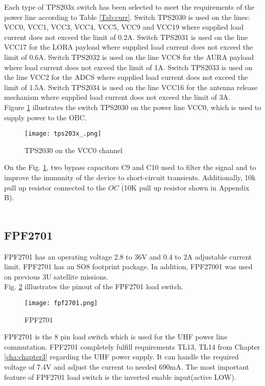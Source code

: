 Each type of TPS203x switch has been selected to meet the requirements of the power line according to Table \ref{Tab:curr}. Switch TPS2030 is used on the lines: VCC0, VCC1, VCC3, VCC4, VCC5, VCC9 and VCC19  where supplied  load current does not exceed the limit of 0.2A. Switch TPS2031 is used on the line VCC17 for the LORA payload where supplied load current does not exceed the limit of 0.6A. Switch TPS2032 is used on the line VCC8 for the AURA payload where load current does not exceed the limit of 1A. Switch TPS2033 is used on the line VCC2 for the ADCS where supplied load current does not exceed the limit of 1.5A. Switch TPS2034 is used on the line VCC16 for the antenna release mechanism where supplied load current does not exceed the limit of 3A. \\

Figure \ref{fig: vcc0} illustrates the switch TPS2030 on the power line VCC0, which is used to supply power to the OBC.

\begin{figure}[h]
	\centering
	\texttt{[image: tps203x\_.png]}
	\caption{TPS2030 on the VCC0 channel}
	\label{fig: vcc0}
\end{figure} 

On the Fig. \ref{fig: vcc0}, two bypass capacitors C9 and C10 used to filter the signal and to improve the immunity of the device to short-circuit transients.   Additionally, 10k pull up resistor connected to the $\overline{OC}$ (10K pull up resistor shown in Appendix B). \\ \\

\subsection{FPF2701}

FPF2701 has an operating voltage 2.8 to 36V and 0.4 to 2A adjustable current limit. FPF2701 has an SO8 footprint package. In addition, FPF27001 was used on previous 3U satellite missions.\\

Fig. \ref{fig: fpf2712} illlustrates the pinout of the FPF2701 load switch.

\begin{figure}[h]
	\centering
	\texttt{[image: fpf2701.png]}
	\caption{FPF2701 \cite{27}}
	\label{fig: fpf2712}
\end{figure} 

FPF2701 is the 8 pin load switch which is used for the UHF power line commutation. FPF2701 completely fulfill requirements TL13, TL14 from Chapter \ref{cha:chapter3} regarding the UHF power supply. It can handle the required voltage of 7.4V and adjust the current to needed 690mA. The most important feature of FPF2701 load switch is the inverted enable input(active LOW).\\

